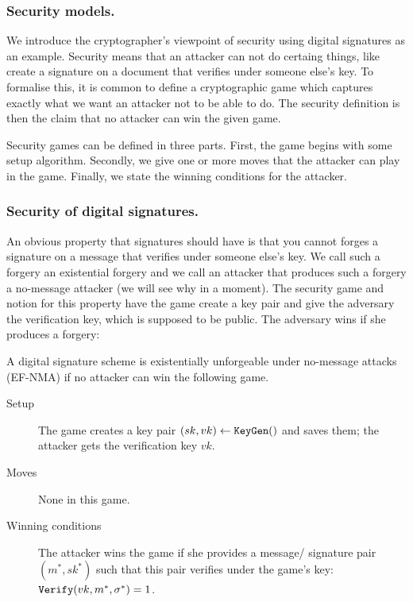 \documentclass{llncs}
\newcommand{\alg}[1]{\textup{\texttt{#1}}}
\begin{document}
\subsubsection{Security models.}
We introduce the cryptographer's viewpoint of security using digital signatures
as an example. Security means that an attacker can not do certaing things, like
create a signature on a document that verifies under someone else's key. To
formalise this, it is common to define a cryptographic game which captures
exactly what we want an attacker not to be able to do. The security definition
is then the claim that no attacker can win the given game.

Security games can be defined in three parts. First, the game begins with some
setup algorithm. Secondly, we give one or more moves that the attacker can play
in the game. Finally, we state the winning conditions for the attacker.

\subsubsection{Security of digital signatures.}
An obvious property that signatures should have is that you cannot forges a
signature on a message that verifies under someone else's key. We call such a
forgery an existential forgery and we call an attacker that produces such a
forgery a no-message attacker (we will see why in a moment). The security game
and notion for this property have the game create a key pair and give the
adversary the verification key, which is supposed to be public. The adversary
wins if she produces a forgery:

\begin{definition}
A digital signature scheme is existentially unforgeable under no-message attacks
(EF-NMA) if no attacker can win the following game.

    \begin{description}
    \item[Setup] The game creates a key pair $(sk, vk) \gets \alg{KeyGen}()$ and
                 saves them; the attacker gets the verification key $vk$.

    \item[Moves] None in this game.

    \item[Winning conditions] The attacker wins the game if she provides a
    message/ signature pair $(m^*, sk^*)$ such that this pair verifies under the
    game's key: $\alg{Verify}(vk, m^*, \sigma^*) = 1$.
    \end{description}
\end{definition}
\end{document}
